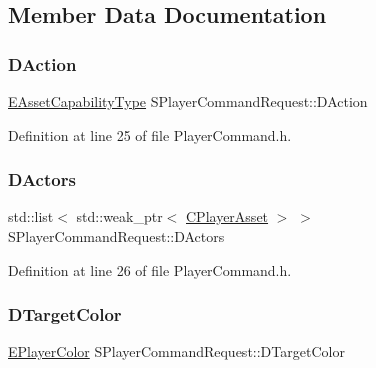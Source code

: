 \subsection{Member Data Documentation}
\hypertarget{structSPlayerCommandRequest_a80897bbccf2c4e0b148a7aa815a926c6}{}\label{structSPlayerCommandRequest_a80897bbccf2c4e0b148a7aa815a926c6} 
\subsubsection{\texorpdfstring{D\+Action}{DAction}}
{\footnotesize\ttfamily \hyperlink{GameDataTypes_8h_a35b98ce26aca678b03c6f9f76e4778ce}{E\+Asset\+Capability\+Type} S\+Player\+Command\+Request\+::\+D\+Action}



Definition at line 25 of file Player\+Command.\+h.

\hypertarget{structSPlayerCommandRequest_aa37fc01519676345703d78b9f573894a}{}\label{structSPlayerCommandRequest_aa37fc01519676345703d78b9f573894a} 
\subsubsection{\texorpdfstring{D\+Actors}{DActors}}
{\footnotesize\ttfamily std\+::list$<$ std\+::weak\+\_\+ptr$<$ \hyperlink{classCPlayerAsset}{C\+Player\+Asset} $>$ $>$ S\+Player\+Command\+Request\+::\+D\+Actors}



Definition at line 26 of file Player\+Command.\+h.

\hypertarget{structSPlayerCommandRequest_a3690a5117efe6214d92f18d672b5714f}{}\label{structSPlayerCommandRequest_a3690a5117efe6214d92f18d672b5714f} 
\subsubsection{\texorpdfstring{D\+Target\+Color}{DTargetColor}}
{\footnotesize\ttfamily \hyperlink{GameDataTypes_8h_aafb0ca75933357ff28a6d7efbdd7602f}{E\+Player\+Color} S\+Player\+Command\+Request\+::\+D\+Target\+Color}



